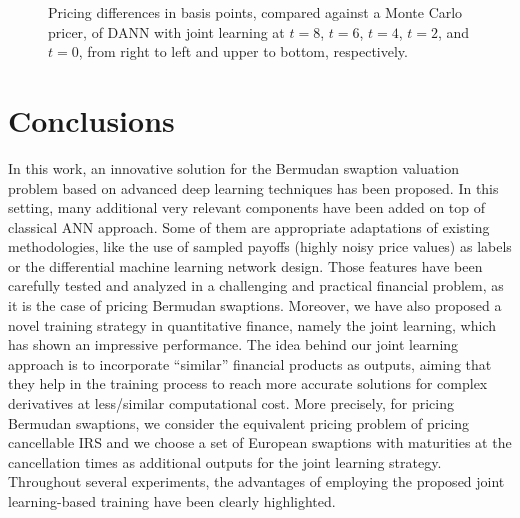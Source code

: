 		\begin{figure}[h!]
			\centering
			\caption{Pricing differences in basis points, compared against a Monte Carlo pricer, of  DANN with joint learning at $t=8$, $t=6$, $t=4$, $t=2$, and $t=0$, from right to left and upper to bottom, respectively.}
			\label{fig:diferences_time_joint_t}
		\end{figure}



\section{Conclusions}\label{sec:conclusions}

    In this work, an innovative solution for the Bermudan swaption valuation problem based on advanced deep learning techniques has been proposed. In this setting, many additional very relevant components have been added on top of classical ANN approach. Some of them are appropriate adaptations of existing methodologies, like the use of sampled payoffs (highly noisy price values) as labels or the differential machine learning network design. Those features have been carefully tested and analyzed in a challenging and practical financial problem, as it is the case of pricing Bermudan swaptions. Moreover, we have also proposed a novel training strategy in quantitative finance, namely the joint learning, which has shown an impressive performance. The idea behind our joint learning approach is to incorporate ``similar'' financial products as outputs, aiming that they help in the training process to reach more accurate solutions for complex derivatives at less/similar computational cost. More precisely, for pricing Bermudan swaptions, we consider the equivalent pricing problem of pricing cancellable IRS and we choose a set of European swaptions with maturities at the cancellation times as additional outputs for the joint learning strategy. Throughout several experiments, the advantages of employing the proposed joint learning-based training have been clearly highlighted.

